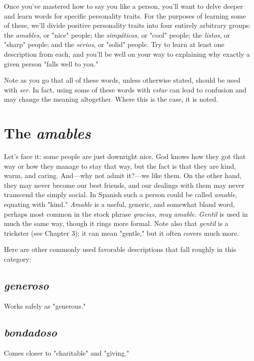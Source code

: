 \documentclass[14pt,a4paper,oneside]{memoir}
\begin{document}
Once you've mastered how to say you like a person, you'll
want to delve deeper and learn words for specific personality traits. For
the purposes of learning some of these, we'll divide positive personality traits into four entirely arbitrary groups: the \emph{amables}, or "nice"
people; the \emph{simpáticos}, or "cool" people; the \emph{listos}, or "sharp" people;
and the \emph{serios}, or "solid" people. Try to learn at least one description
from each, and you'll be well on your way to explaining why exactly a
given person "falls well to you."

Note as you go that all of these words, unless otherwise stated,
should be used with \emph{ser}. In fact, using some of these words with \emph{estar}
can lead to confusion and may change the meaning altogether. Where
this is the case, it is noted.

\section{The \emph{amables}}

Let's face it: some people are just downright nice. God knows
how they got that way or how they manage to stay that way, but the
fact is that they are kind, warm, and caring. And---why not admit
it?---we like them. On the other hand, they may never become our best
friends, and our dealings with them may never transcend the simply
social. In Spanish such a person could be called \emph{amable}, equating with
"kind." \emph{Amable} is a useful, generic, and somewhat bland word, perhaps most common in the stock phrase \emph{gracias, muy amable}. \emph{Gentil}
is used in much the same way, though it rings more formal. Note also
that \emph{gentil} is a trickster (see Chapter 3); it can mean "gentle," but it often covers much more.

Here are other commonly used favorable descriptions that fall
roughly in this category:

\subsection{\emph{generoso}}

Works safely as "generous."

\subsection{\emph{bondadoso}}

Comes closer to "charitable" and "giving."
\end{document}
